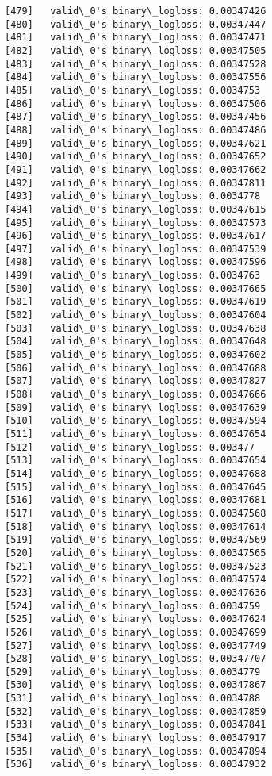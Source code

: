 \documentclass[11pt]{article}
\begin{document}
\begin{Verbatim}[commandchars=\\\{\}]
[479]	valid\_0's binary\_logloss: 0.00347426
[480]	valid\_0's binary\_logloss: 0.00347447
[481]	valid\_0's binary\_logloss: 0.00347471
[482]	valid\_0's binary\_logloss: 0.00347505
[483]	valid\_0's binary\_logloss: 0.00347528
[484]	valid\_0's binary\_logloss: 0.00347556
[485]	valid\_0's binary\_logloss: 0.0034753
[486]	valid\_0's binary\_logloss: 0.00347506
[487]	valid\_0's binary\_logloss: 0.00347456
[488]	valid\_0's binary\_logloss: 0.00347486
[489]	valid\_0's binary\_logloss: 0.00347621
[490]	valid\_0's binary\_logloss: 0.00347652
[491]	valid\_0's binary\_logloss: 0.00347662
[492]	valid\_0's binary\_logloss: 0.00347811
[493]	valid\_0's binary\_logloss: 0.0034778
[494]	valid\_0's binary\_logloss: 0.00347615
[495]	valid\_0's binary\_logloss: 0.00347573
[496]	valid\_0's binary\_logloss: 0.00347617
[497]	valid\_0's binary\_logloss: 0.00347539
[498]	valid\_0's binary\_logloss: 0.00347596
[499]	valid\_0's binary\_logloss: 0.0034763
[500]	valid\_0's binary\_logloss: 0.00347665
[501]	valid\_0's binary\_logloss: 0.00347619
[502]	valid\_0's binary\_logloss: 0.00347604
[503]	valid\_0's binary\_logloss: 0.00347638
[504]	valid\_0's binary\_logloss: 0.00347648
[505]	valid\_0's binary\_logloss: 0.00347602
[506]	valid\_0's binary\_logloss: 0.00347688
[507]	valid\_0's binary\_logloss: 0.00347827
[508]	valid\_0's binary\_logloss: 0.00347666
[509]	valid\_0's binary\_logloss: 0.00347639
[510]	valid\_0's binary\_logloss: 0.00347594
[511]	valid\_0's binary\_logloss: 0.00347654
[512]	valid\_0's binary\_logloss: 0.003477
[513]	valid\_0's binary\_logloss: 0.00347654
[514]	valid\_0's binary\_logloss: 0.00347688
[515]	valid\_0's binary\_logloss: 0.00347645
[516]	valid\_0's binary\_logloss: 0.00347681
[517]	valid\_0's binary\_logloss: 0.00347568
[518]	valid\_0's binary\_logloss: 0.00347614
[519]	valid\_0's binary\_logloss: 0.00347569
[520]	valid\_0's binary\_logloss: 0.00347565
[521]	valid\_0's binary\_logloss: 0.00347523
[522]	valid\_0's binary\_logloss: 0.00347574
[523]	valid\_0's binary\_logloss: 0.00347636
[524]	valid\_0's binary\_logloss: 0.0034759
[525]	valid\_0's binary\_logloss: 0.00347624
[526]	valid\_0's binary\_logloss: 0.00347699
[527]	valid\_0's binary\_logloss: 0.00347749
[528]	valid\_0's binary\_logloss: 0.00347707
[529]	valid\_0's binary\_logloss: 0.0034779
[530]	valid\_0's binary\_logloss: 0.00347867
[531]	valid\_0's binary\_logloss: 0.0034788
[532]	valid\_0's binary\_logloss: 0.00347859
[533]	valid\_0's binary\_logloss: 0.00347841
[534]	valid\_0's binary\_logloss: 0.00347917
[535]	valid\_0's binary\_logloss: 0.00347894
[536]	valid\_0's binary\_logloss: 0.00347932

\end{Verbatim}
\end{document}
